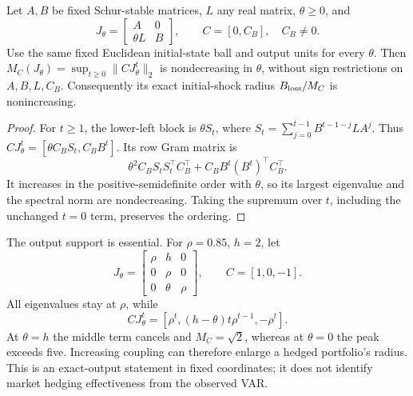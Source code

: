\begin{proposition}
\label{prop:signed_target_coupling}
Let $A,B$ be fixed Schur-stable matrices, $L$ any real matrix, $\theta\ge0$, and
\[
J_\theta=\begin{bmatrix}A&0\\\theta L&B\end{bmatrix},\qquad C=[0,C_B],\quad C_B\ne0.
\]
Use the same fixed Euclidean initial-state ball and output units for every $\theta$. Then $M_C(J_\theta)=\sup_{t\ge0}\|CJ_\theta^t\|_2$ is nondecreasing in $\theta$, without sign restrictions on $A,B,L,C_B$. Consequently its exact initial-shock radius $B_{\rm loss}/M_C$ is nonincreasing.
\end{proposition}
\begin{proof}
For $t\ge1$, the lower-left block is $\theta S_t$, where $S_t=\sum_{j=0}^{t-1}B^{t-1-j}LA^j$. Thus $CJ_\theta^t=[\theta C_BS_t,C_BB^t]$. Its row Gram matrix is
\[
\theta^2 C_BS_tS_t^\top C_B^\top+C_BB^t(B^t)^\top C_B^\top.
\]
It increases in the positive-semidefinite order with $\theta$, so its largest eigenvalue and the spectral norm are nondecreasing. Taking the supremum over $t$, including the unchanged $t=0$ term, preserves the ordering.
\end{proof}
The output support is essential. For $\rho=0.85$, $h=2$, let
\[
J_\theta=\begin{bmatrix}\rho&h&0\\0&\rho&0\\0&\theta&\rho\end{bmatrix},\qquad C=[1,0,-1].
\]
All eigenvalues stay at $\rho$, while
\[
CJ_\theta^t=[\rho^t,(h-\theta)t\rho^{t-1},-\rho^t].
\]
At $\theta=h$ the middle term cancels and $M_C=\sqrt2$, whereas at $\theta=0$ the peak exceeds five. Increasing coupling can therefore enlarge a hedged portfolio's radius. This is an exact-output statement in fixed coordinates; it does not identify market hedging effectiveness from the observed VAR.

